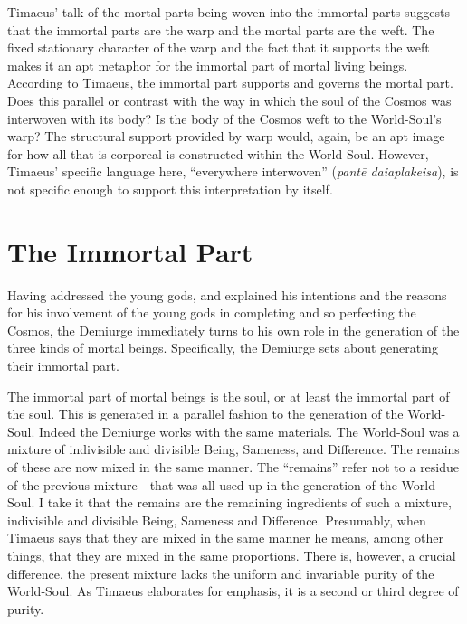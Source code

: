 Timaeus' talk of the mortal parts being woven into the immortal parts suggests that the immortal parts are the warp and the mortal parts are the weft. The fixed stationary character of the warp and the fact that it supports the weft makes it an apt metaphor for the immortal part of mortal living beings. According to Timaeus, the immortal part supports and governs the mortal part. Does this parallel or contrast with the way in which the soul of the Cosmos was interwoven with its body? Is the body of the Cosmos weft to the World-Soul's warp? The structural support provided by warp would, again, be an apt image for how all that is corporeal is constructed within the World-Soul. However, Timaeus' specific language here, ``everywhere interwoven'' (\emph{pantē daiaplakeisa}), is not specific enough to support this interpretation by itself.


\section{The Immortal Part} %
\label{sec:the_immortal_part}

Having addressed the young gods, and explained his intentions and the reasons for his involvement of the young gods in completing and so perfecting the Cosmos, the Demiurge immediately turns to his own role in the generation of the three kinds of mortal beings. Specifically, the Demiurge sets about generating their immortal part. 

The immortal part of mortal beings is the soul, or at least the immortal part of the soul. This is generated in a parallel fashion to the generation of the World-Soul. Indeed the Demiurge works with the same materials. The World-Soul was a mixture of indivisible and divisible Being, Sameness, and Difference. The remains of these are now mixed in the same manner. The ``remains'' refer not to a residue of the previous mixture---that was all used up in the generation of the World-Soul. I take it that the remains are the remaining ingredients of such a mixture, indivisible and divisible Being, Sameness and Difference. Presumably, when Timaeus says that they are mixed in the same manner he means, among other things, that they are mixed in the same proportions. There is, however, a crucial difference, the present mixture lacks the uniform and invariable purity of the World-Soul. As Timaeus elaborates for emphasis, it is a second or third degree of purity. 

